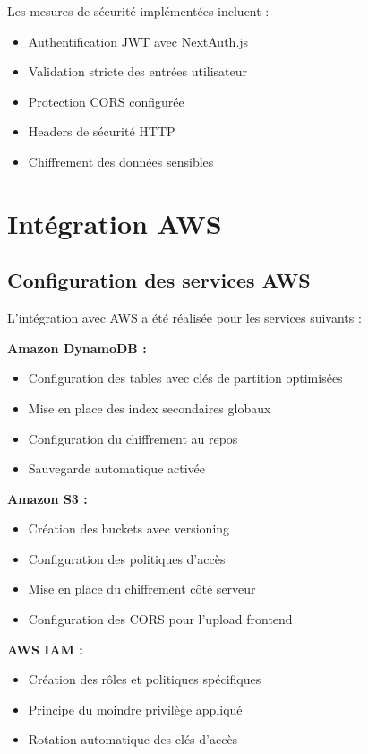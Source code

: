 Les mesures de sécurité implémentées incluent :
\begin{itemize}
    \item Authentification JWT avec NextAuth.js
    \item Validation stricte des entrées utilisateur
    \item Protection CORS configurée
    \item Headers de sécurité HTTP
    \item Chiffrement des données sensibles
\end{itemize}

\section{Intégration AWS}

\subsection{Configuration des services AWS}

L'intégration avec AWS a été réalisée pour les services suivants :

\textbf{Amazon DynamoDB :}
\begin{itemize}
    \item Configuration des tables avec clés de partition optimisées
    \item Mise en place des index secondaires globaux
    \item Configuration du chiffrement au repos
    \item Sauvegarde automatique activée
\end{itemize}

\textbf{Amazon S3 :}
\begin{itemize}
    \item Création des buckets avec versioning
    \item Configuration des politiques d'accès
    \item Mise en place du chiffrement côté serveur
    \item Configuration des CORS pour l'upload frontend
\end{itemize}

\textbf{AWS IAM :}
\begin{itemize}
    \item Création des rôles et politiques spécifiques
    \item Principe du moindre privilège appliqué
    \item Rotation automatique des clés d'accès
\end{itemize}

